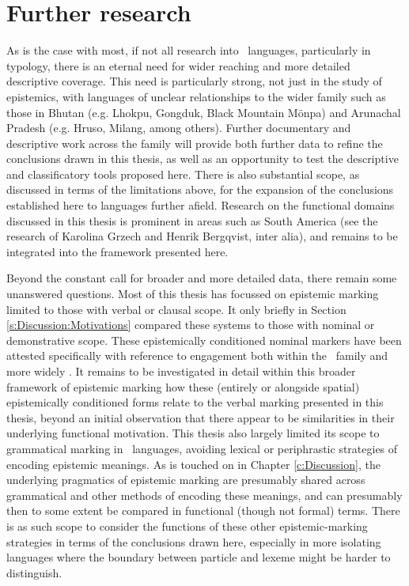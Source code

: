 \section{Further research}
As is the case with most, if not all research into \lfam\ languages, particularly in typology, there is an eternal need for wider reaching and more detailed descriptive coverage. This need is particularly strong, not just in the study of epistemics, with languages of unclear relationships to the wider family such as those in Bhutan (e.g. Lhokpu, Gongduk, Black Mountain Mönpa) and Arunachal Pradesh (e.g. Hruso, Milang, among others). Further documentary and descriptive work across the family will provide both further data to refine the conclusions drawn in this thesis, as well as an opportunity to test the descriptive and classificatory tools proposed here. There is also substantial scope, as discussed in terms of the limitations above, for the expansion of the conclusions established here to languages further afield. Research on the functional domains discussed in this thesis is prominent in areas such as South America (see the research of Karolina Grzech and Henrik Bergqvist, inter alia), and remains to be integrated into the framework presented here.

Beyond the constant call for broader and more detailed data, there remain some unanswered questions. Most of this thesis has focussed on epistemic marking limited to those with verbal or clausal scope. It only briefly in Section \ref{s:Discussion:Motivations} compared these systems to those with nominal or demonstrative scope. These epistemically conditioned nominal markers have been attested specifically with reference to engagement both within the \lfam\ family \cite{GonzalezPerez2022} and more widely \cites{EvansBergqvistSanRoque2018a}{EvansBergqvistSanRoque2018b}. It remains to be investigated in detail within this broader framework of epistemic marking how these (entirely or alongside spatial) epistemically conditioned forms relate to the verbal marking presented in this thesis, beyond an initial observation that there appear to be similarities in their underlying functional motivation. This thesis also largely limited its scope to grammatical marking in \lfam\ languages, avoiding lexical or periphrastic strategies of encoding epistemic meanings. As is touched on in Chapter \ref{c:Discussion}, the underlying pragmatics of epistemic marking are presumably shared across grammatical and other methods of encoding these meanings, and can presumably then to some extent be compared in functional (though not formal) terms. There is as such scope to consider the functions of these other epistemic-marking strategies in terms of the conclusions drawn here, especially in more isolating languages where the boundary between particle and lexeme might be harder to distinguish.